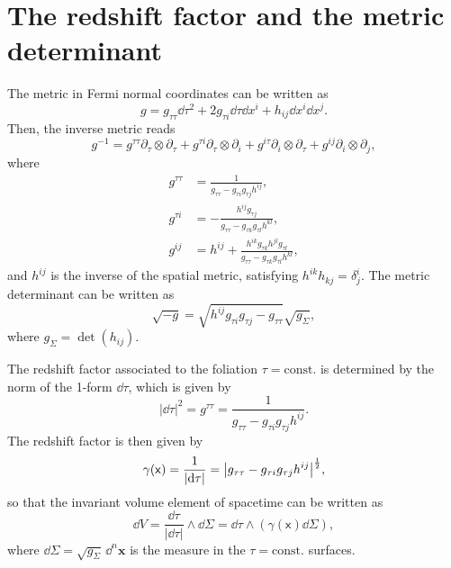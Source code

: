 \documentclass[prd,twocolumn,superscriptaddress,floatfix,amsmath,amssymb,amsfonts,longbibliography,nofootinbib]{revtex4-1}
\newcommand{\mf}{\mathsf}%
\begin{document}
\section{The redshift factor and the metric determinant}\label{app:det}

The metric in Fermi normal coordinates can be written as
\begin{equation}\label{eq:ADM}
    g = g_{\tau\tau}\dd\tau^2 +2g_{\tau i} \dd \tau \dd x^i+h_{ij}\dd x^i \dd x^j.
\end{equation}
Then, the inverse metric reads
\begin{equation}
    g^{-1} = g^{\tau\tau}\partial_\tau\otimes\partial_\tau + g^{\tau i}\partial_\tau \otimes \partial_i+g^{i\tau}\partial_i \otimes \partial_\tau + g^{ij}\partial_i\otimes\partial_j,
\end{equation}
where
\begin{align}
    g^{\tau\tau} &= \frac{1}{g_{\tau\tau} - g_{\tau i}g_{\tau j} h^{ij}},\\
    g^{\tau i} &= -\frac{h^{ij}g_{\tau j}}{g_{\tau\tau} - g_{\tau k}g_{\tau l} h^{kl}},\\
    g^{ij} &= h^{ij} + \frac{h^{ik}g_{\tau k}h^{jl}g_{\tau l}}{g_{\tau\tau} - g_{\tau k}g_{\tau l} h^{kl}},
\end{align}
and $h^{ij}$ is the inverse of the spatial metric, satisfying $h^{ik}h_{kj} = \delta^i_j$. The metric determinant can be written as
\begin{equation}
    \sqrt{-g} = \sqrt{h^{ij}g_{\tau i} g_{\tau j} -g_{\tau\tau}} \sqrt{g_{\Sigma}},
\end{equation}
where $g_{\Sigma} = \det(h_{ij})$.


The redshift factor associated to the foliation \mbox{$\tau = \text{const.}$} is determined by the norm of the 1-form $\dd \tau$, which is given by 
\begin{equation}
    {|\dd \tau|}^2 = g^{\tau\tau} = \frac{1}{g_{\tau\tau} - g_{\tau i}g_{\tau j} h^{ij}}.
\end{equation}
The redshift factor is then given by
\begin{equation}
    \gamma(\mf x) = \frac{1}{|\dd\tau|} = \abs{g_{\tau\tau} - g_{\tau i}g_{\tau j} h^{ij}}^\frac{1}{2},
\end{equation}
so that the invariant volume element of spacetime can be written as
\begin{equation}
    \dd V = \frac{\dd \tau}{|\dd \tau|}\wedge \dd \Sigma = \dd\tau \wedge(\gamma(\mf x) \dd \Sigma),
\end{equation}
where $\dd \Sigma = \sqrt{g_{\Sigma}}\,\dd^n \bm x$ is the measure in the \mbox{$\tau = \text{const}.$} surfaces.



    
\end{document}

